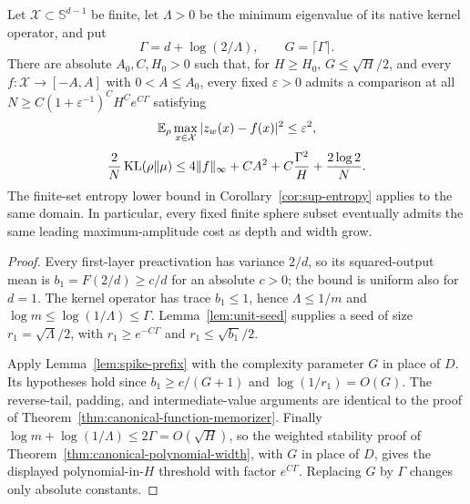 \begin{corollary}
\label{cor:arbitrary-finite-domain}
Let $\mathcal X\subset\mathbb S^{d-1}$ be finite, let $\Lambda>0$ be the minimum eigenvalue of its native kernel operator, and put
\[
 \Gamma=d+\log(2/\Lambda),\qquad G=\lceil\Gamma\rceil.
\]
There are absolute $A_0,C,H_0>0$ such that, for $H\ge H_0$, $G\le\sqrt H/2$, and every $f:\mathcal X\to[-A,A]$ with $0<A\le A_0$, every fixed $\varepsilon>0$ admits a comparison at all $N\ge C(1+\varepsilon^{-1})^C H^C e^{C\Gamma}$ satisfying
\[
 \mathbb E_\rho\max_{x\in\mathcal X}|z_w(x)-f(x)|^2\le\varepsilon^2,
\]
\[
 \frac2N\operatorname{KL}(\rho\|\mu)
 \le4\|f\|_\infty+CA^2+C\frac{\Gamma^2}{H}
       +\frac{2\log2}{N}.
\]
The finite-set entropy lower bound in Corollary~\ref{cor:sup-entropy} applies to the same domain. In particular, every fixed finite sphere subset eventually admits the same leading maximum-amplitude cost as depth and width grow.
\end{corollary}
\begin{proof}
Every first-layer preactivation has variance $2/d$, so its squared-output mean is $b_1=F(2/d)\ge c/d$ for an absolute $c>0$; the bound is uniform also for $d=1$. The kernel operator has trace $b_1\le1$, hence $\Lambda\le1/m$ and $\log m\le\log(1/\Lambda)\le\Gamma$. Lemma~\ref{lem:unit-seed} supplies a seed of size $r_1=\sqrt\Lambda/2$, with $r_1\ge e^{-C\Gamma}$ and $r_1\le\sqrt{b_1}/2$.

Apply Lemma~\ref{lem:spike-prefix} with the complexity parameter $G$ in place of $D$. Its hypotheses hold since $b_1\ge c/(G+1)$ and $\log(1/r_1)=O(G)$. The reverse-tail, padding, and intermediate-value arguments are identical to the proof of Theorem~\ref{thm:canonical-function-memorizer}. Finally $\log m+\log(1/\Lambda)\le2\Gamma=O(\sqrt H)$, so the weighted stability proof of Theorem~\ref{thm:canonical-polynomial-width}, with $G$ in place of $D$, gives the displayed polynomial-in-$H$ threshold with factor $e^{C\Gamma}$. Replacing $G$ by $\Gamma$ changes only absolute constants.
\end{proof}
